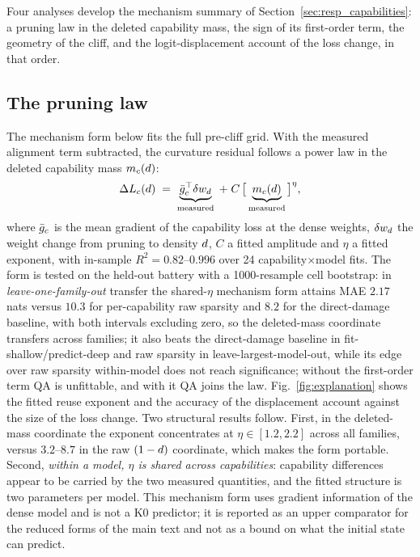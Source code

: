 Four analyses develop the mechanism summary of Section~\ref{sec:resp_capabilities}: a pruning
law in the deleted capability mass, the sign of its first-order term, the geometry of the cliff, and
the logit-displacement account of the loss change, in that order.

\subsection{The pruning law}
\label{sec:law}

The mechanism form below fits the full pre-cliff grid.
With the measured alignment term subtracted, the curvature residual
follows a power law in the deleted capability mass $m_c(d)$:
\begin{equation}
\Delta L_{c}(d)\;=\;\underbrace{\bar{g}_{c}^{\top}\delta w_d}_{\text{measured}}
\;+\;C\,\big[\underbrace{m_c(d)}_{\text{measured}}\big]^{\eta},
\label{eq:fitlaw}
\end{equation}
where $\bar{g}_{c}$ is the mean gradient of the capability loss at the dense weights, $\delta w_d$ the
weight change from pruning to density $d$, $C$ a fitted amplitude and $\eta$ a fitted exponent,
with in-sample $R^2 = 0.82$--$0.996$ over 24 capability$\times$model fits. The form is tested on the held-out battery with a 1000-resample cell bootstrap: in \emph{leave-one-family-out} transfer the
shared-$\eta$ mechanism form attains MAE $2.17$ nats versus $10.3$
for per-capability raw sparsity and $8.2$ for the direct-damage baseline, with both intervals excluding zero, so the deleted-mass coordinate
transfers across families; it also beats the direct-damage baseline in fit-shallow/predict-deep and raw sparsity in leave-largest-model-out, while its edge over raw
sparsity within-model does not reach significance; without the first-order term QA is unfittable, and with it QA joins the law. Fig.~\ref{fig:explanation} shows the fitted reuse exponent and the accuracy of the displacement account against the size of the loss change. Two structural results follow. First, in the deleted-mass coordinate the exponent concentrates at
$\eta\in[1.2,2.2]$ across all families, versus $3.2$--$8.7$ in the
raw $(1-d)$ coordinate, which makes the form portable. Second, \emph{within a model, $\eta$ is shared across capabilities}: capability differences appear to be carried
by the two measured quantities, and the fitted structure is two
parameters per model. This mechanism form uses gradient
information of the dense model and is not a K0 predictor; it
is reported as an upper comparator for the reduced forms of the main
text and not as a bound on what the initial state can predict.

